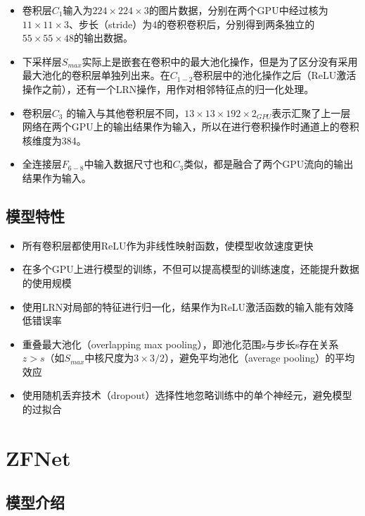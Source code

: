 \documentclass[12pt,a4paper,UTF8,twoside]{book}
\providecommand{\tightlist}{%
  \setlength{\itemsep}{0pt}\setlength{\parskip}{0pt}}
\begin{document}
\begin{itemize}
\item
  卷积层\(C_1\)输入为\(224\times224\times3\)的图片数据，分别在两个GPU中经过核为\(11\times11\times3\)、步长（stride）为4的卷积卷积后，分别得到两条独立的\(55\times55\times48\)的输出数据。
\item
  下采样层\(S_{max}\)实际上是嵌套在卷积中的最大池化操作，但是为了区分没有采用最大池化的卷积层单独列出来。在\(C_{1-2}\)卷积层中的池化操作之后（ReLU激活操作之前），还有一个LRN操作，用作对相邻特征点的归一化处理。
\item
  卷积层\(C_3\) 的输入与其他卷积层不同，\(13\times13\times192\times2_{GPU}\)表示汇聚了上一层网络在两个GPU上的输出结果作为输入，所以在进行卷积操作时通道上的卷积核维度为384。
\item
  全连接层\(F_{6-8}\)中输入数据尺寸也和\(C_3\)类似，都是融合了两个GPU流向的输出结果作为输入。
\end{itemize}

\hypertarget{ux6a21ux578bux7279ux6027-1}{%
\subsection{模型特性}\label{ux6a21ux578bux7279ux6027-1}}

\begin{itemize}
\tightlist
\item
  所有卷积层都使用ReLU作为非线性映射函数，使模型收敛速度更快
\item
  在多个GPU上进行模型的训练，不但可以提高模型的训练速度，还能提升数据的使用规模
\item
  使用LRN对局部的特征进行归一化，结果作为ReLU激活函数的输入能有效降低错误率
\item
  重叠最大池化（overlapping max pooling），即池化范围z与步长s存在关系\(z>s\)（如\(S_{max}\)中核尺度为\(3\times3/2\)），避免平均池化（average pooling）的平均效应
\item
  使用随机丢弃技术（dropout）选择性地忽略训练中的单个神经元，避免模型的过拟合
\end{itemize}

\hypertarget{zfnet}{%
\section{ZFNet}\label{zfnet}}

\hypertarget{ux6a21ux578bux4ecbux7ecd-2}{%
\subsection{模型介绍}\label{ux6a21ux578bux4ecbux7ecd-2}}
\end{document}
